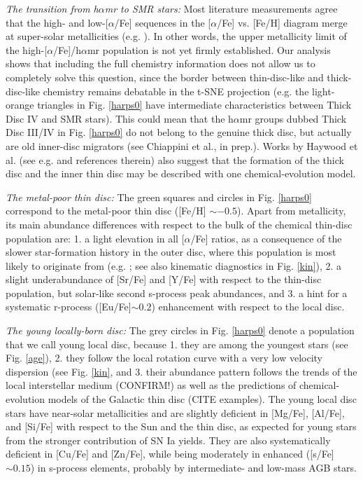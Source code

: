 \documentclass{aa}  %
\begin{document}
{\it The transition from h$\alpha$mr to SMR stars:} Most literature measurements agree that the high- and low-[$\alpha$/Fe] sequences in the [$\alpha$/Fe] vs. [Fe/H] diagram merge at super-solar metallicities (e.g. \citealt{Adibekyan2011, Anders2014, Hayden2015}). In other words, the upper metallicity limit of the high-[$\alpha$/Fe]/h$\alpha$mr population is not yet firmly established. Our analysis shows that including the full chemistry information does not allow us to completely solve this question, since the border between thin-disc-like and thick-disc-like chemistry remains debatable in the t-SNE projection (e.g. the light-orange triangles in Fig. \ref{harps0} have intermediate characteristics between Thick Disc IV and SMR stars). This could mean that the h$\alpha$mr groups dubbed Thick Disc III/IV in Fig. \ref{harps0} do not belong to the genuine thick disc, but actually are old inner-disc migrators (see Chiappini et al., in prep.). Works by Haywood et al. (see e.g. \citealt{Haywood2018} and references therein) also suggest that the formation of the thick disc and the inner thin disc may be described with one chemical-evolution model. 

{\it The metal-poor thin disc:} The green squares and circles in Fig. \ref{harps0} correspond to the metal-poor thin disc ([Fe/H] $\sim-0.5$). Apart from metallicity, its main abundance differences with respect to the bulk of the chemical thin-disc population are: 1. a light elevation in all [$\alpha$/Fe] ratios, as a consequence of the slower star-formation history in the outer disc, where this population is most likely to originate from (e.g. \citealt{Nordstroem2004, Anders2014, Hayden2015}; see also kinematic diagnostics in Fig. \ref{kin}), 2. a slight underabundance of [Sr/Fe] and [Y/Fe] with respect to the thin-disc population, but solar-like second s-process peak abundances, and 3. 
a hint for a systematic r-process ([Eu/Fe]$\sim0.2$) enhancement with respect to the local disc.

{\it The young locally-born disc:} The grey circles in Fig. \ref{harps0} denote a population that we call young local disc, because 1. they are among the youngest stars (see Fig. \ref{age}), 2. they follow the local rotation curve with a very low velocity dispersion (see Fig. \ref{kin}, and 3. their abundance pattern follows the trends of the local interstellar medium (CONFIRM!) as well as the predictions of chemical-evolution models of the Galactic thin disc (CITE examples). The young local disc stars have near-solar metallicities and are slightly deficient in [Mg/Fe], [Al/Fe], and [Si/Fe] with respect to the Sun and the thin disc, as expected for young stars from the stronger contribution of SN Ia yields. They are also systematically deficient in [Cu/Fe] and [Zn/Fe], while being moderately in enhanced ([s/Fe]$\sim0.15$) in s-process elements, probably by intermediate- and low-mass AGB stars. 
\end{document}
